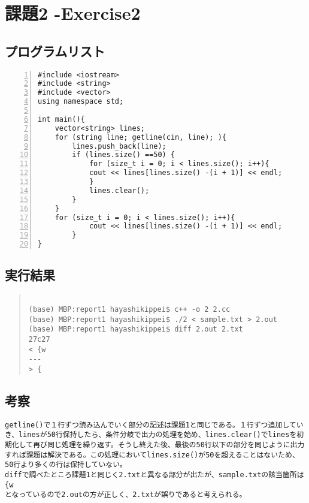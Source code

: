 \documentclass[11pt,a4paper]{jsarticle}
\begin{document}
\section{課題2 -Exercise2}
\subsection{プログラムリスト}
\label{sec:prog-list2}

\begin{lstlisting}[numbers=left,numberstyle=\ttfamily,xleftmargin=2zw]
#include <iostream>
#include <string>
#include <vector>
using namespace std;

int main(){
    vector<string> lines;
    for (string line; getline(cin, line); ){
        lines.push_back(line);
        if (lines.size() ==50) {
            for (size_t i = 0; i < lines.size(); i++){
            cout << lines[lines.size() -(i + 1)] << endl;
            }
            lines.clear();
        }        
    }
    for (size_t i = 0; i < lines.size(); i++){
            cout << lines[lines.size() -(i + 1)] << endl;
        }
}
\end{lstlisting}
%
\subsection{実行結果}
\begin{quote}           %
\begin{verbatim}

(base) MBP:report1 hayashikippei$ c++ -o 2 2.cc
(base) MBP:report1 hayashikippei$ ./2 < sample.txt > 2.out
(base) MBP:report1 hayashikippei$ diff 2.out 2.txt
27c27
< {w
---
> {

\end{verbatim}
\end{quote}
%
\subsection{考察}
\begin{verbatim}
getline()で１行ずつ読み込んでいく部分の記述は課題1と同じである。１行ずつ追加していき、linesが50行保持したら、条件分岐で出力の処理を始め、lines.clear()でlinesを初期化して再び同じ処理を繰り返す。そうし終えた後、最後の50行以下の部分を同じように出力すれば課題は解決である。この処理においてlines.size()が50を超えることはないため、50行より多くの行は保持していない。
diffで調べたところ課題1と同じく2.txtと異なる部分が出たが、sample.txtの該当箇所は{w
となっているので2.outの方が正しく、2.txtが誤りであると考えられる。
\end{verbatim}
%
\end{document}
